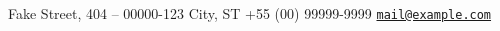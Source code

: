 \documentclass[a4paper]{article}
\makeatletter
\newcommand{\myaddress}{Fake Street, 404 -- 00000-123}
\newcommand{\myphone}{+55 (00) 99999-9999}
\newcommand{\myemail}{\href{mailto:mail@example.com}{\texttt{mail@example.com}}}
\newcommand{\mycity}{City, ST}
\makeatother
\begin{document}
\begin{paracol}{2}
\newlength{\rightcolwidth}
\setlength{\rightcolwidth}{0.75\textwidth}
\begin{minipage}[t]{\rightcolwidth}
\begin{center}\fontfamily{\sfdefault}\selectfont \color{black!70}
{\small
{} \myaddress \;\;
 \mycity \;\; \newline \newline
{} \myphone \;\;
 \myemail
}
\end{center}
\end{minipage}



\end{paracol}
\end{document}
